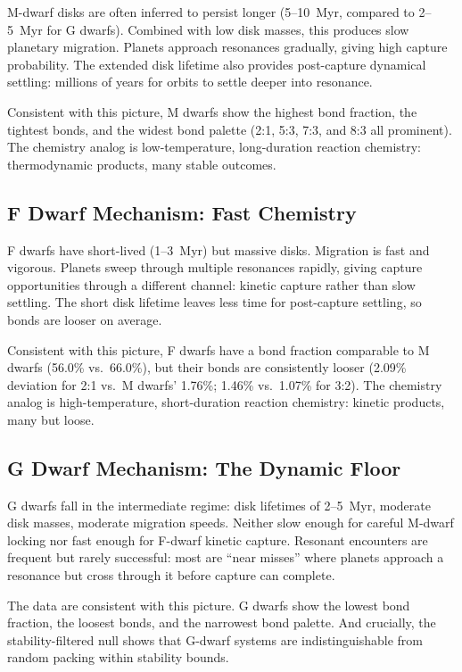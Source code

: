\documentclass[twocolumn]{aastex631}
\begin{document}
M-dwarf disks are often inferred to persist longer (5--10~Myr, compared to
2--5~Myr for G dwarfs)\citep{yasui2010,haisch2001}. Combined with low disk
masses, this produces slow planetary migration. Planets approach resonances
gradually, giving high capture probability. The extended disk lifetime also
provides post-capture dynamical settling: millions of years for orbits to settle
deeper into resonance.

Consistent with this picture, M dwarfs show the highest bond fraction, the
tightest bonds, and the widest bond palette (2:1, 5:3, 7:3, and 8:3 all
prominent). The chemistry analog is low-temperature, long-duration reaction
chemistry: thermodynamic products, many stable outcomes.

\subsection{F Dwarf Mechanism: Fast Chemistry}

F dwarfs have short-lived (1--3~Myr) but massive disks\citep{sicilia_aguilar}.
Migration is fast and vigorous. Planets sweep through multiple resonances
rapidly, giving capture opportunities through a different channel: kinetic
capture rather than slow settling. The short disk lifetime leaves less time for
post-capture settling, so bonds are looser on average.

Consistent with this picture, F dwarfs have a bond fraction comparable to M
dwarfs (56.0\% vs.\ 66.0\%), but their bonds are consistently looser (2.09\%
deviation for 2:1 vs.\ M dwarfs' 1.76\%; 1.46\% vs.\ 1.07\% for 3:2). The
chemistry analog is high-temperature, short-duration reaction chemistry:
kinetic products, many but loose.

\subsection{G Dwarf Mechanism: The Dynamic Floor}

G dwarfs fall in the intermediate regime: disk lifetimes of 2--5~Myr, moderate
disk masses, moderate migration speeds. Neither slow enough for careful M-dwarf
locking nor fast enough for F-dwarf kinetic capture. Resonant encounters are
frequent but rarely successful: most are ``near misses'' where planets approach
a resonance but cross through it before capture can complete.

The data are consistent with this picture. G dwarfs show the lowest bond
fraction, the loosest bonds, and the narrowest bond palette. And crucially, the
stability-filtered null shows that G-dwarf systems are indistinguishable from
random packing within stability bounds.
\end{document}
